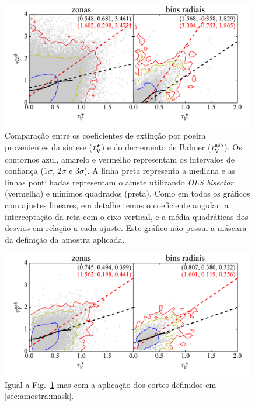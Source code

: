 \begin{figure}
	\centering
	\includegraphics[width=0.99\textwidth]{figuras/CompareTauV.pdf}
	\caption[Comparação entre os coeficientes de extinção] 
	{Comparação entre os coeficientes de extinção por poeira provenientes da síntese ($\tau_{\mathrm{V}}^\star$) e
do decremento de Balmer ($\tau_{\mathrm{V}}^{\mathrm{neb}}$). Os contornos azul, amarelo e vermelho representam os
intervalos de confiança ($1\sigma$, $2\sigma$ e $3\sigma$). A linha preta representa a mediana e as linhas
pontilhadas representam o ajuste utilizando {\em OLS bisector} (vermelha) e mínimos quadrados
(preta). Como em todos os gráficos com ajustes lineares, em detalhe temos o coeficiente angular, a
interceptação da reta com o eixo vertical, e a média quadráticas dos desvios em relação a cada
ajuste. Este gráfico não possui a máscara da definição da amostra aplicada.}
	\label{fig:tauVsynvsneb}
\end{figure}

\begin{figure}
	\centering
	\includegraphics[width=0.99\textwidth]{figuras/CompareTauV_realsample.pdf}
	\caption[Comparação entre os coeficientes de extinção da amostra selecionada]
	{Igual a Fig.\ \ref{fig:tauVsynvsneb} mas com a aplicação dos cortes definidos em
\ref{sec:amostra:mask}.} 
	\label{fig:tauVsynvsnebMask}
\end{figure}

